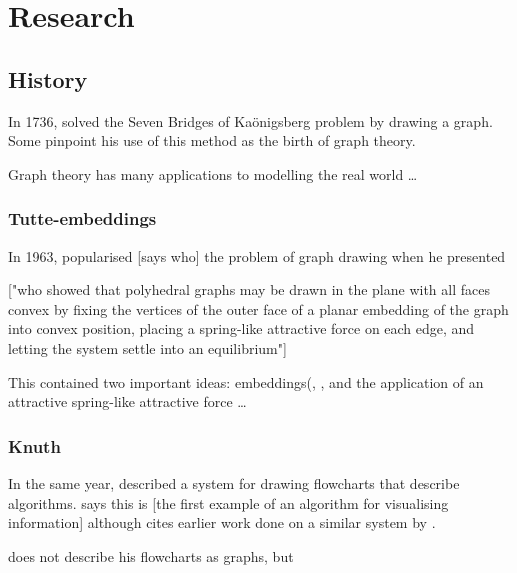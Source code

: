 \chapter{Research}


\section{History}

In 1736, \citet{euler} solved the Seven Bridges of Ka\"{o}nigsberg problem by drawing a graph.
Some \cite{ismail2009some}  pinpoint his use of this method as the birth of graph theory.

Graph theory has many applications to modelling the real world \ldots

\subsection{Tutte-embeddings}

In 1963, \citet{tutte} popularised [says who] the problem of graph drawing when he presented 

["who showed that polyhedral graphs may be drawn in the plane with all faces convex by fixing the vertices of the outer face of a planar embedding of the graph into convex position, placing a spring-like attractive force on each edge, and letting the system settle into an equilibrium"]

This contained two important ideas: embeddings(, , and the application of an attractive spring-like attractive force \ldots 

\subsection{Knuth}

In the same year, \citet{Knuth63} described a system for drawing flowcharts that describe algorithms. \citet{battista}  says this is [the first example of an algorithm for visualising information] although \citeauthor{Knuth63} cites earlier work done on a similar system by \citet{haibt1959}.

\citet{Knuth63} does not describe his flowcharts as graphs, but 

\subsection{}

